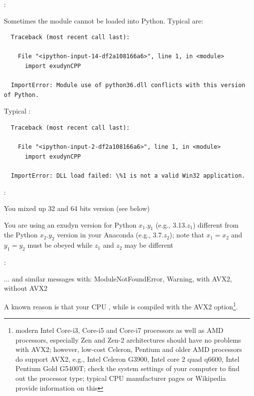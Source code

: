 \noindent {}:
\bi
  \item Sometimes the \codeName module cannot be loaded into Python. Typical  are: \vspace{1pt}\\
\plainlststyle
\begin{lstlisting}
  Traceback (most recent call last):

    File "<ipython-input-14-df2a108166a6>", line 1, in <module>
      import exudynCPP

  ImportError: Module use of python36.dll conflicts with this version of Python.
\end{lstlisting}
%
Typical :\vspace{1pt}\\
\begin{lstlisting}
  Traceback (most recent call last):
  
    File "<ipython-input-2-df2a108166a6>", line 1, in <module>
      import exudynCPP

  ImportError: DLL load failed: \%1 is not a valid Win32 application.
\end{lstlisting}
%
:
\bi
\item[$\ra$] You mixed up 32 and 64 bits version (see below) 
\item[$\ra$] You are using an exudyn version for Python $x_1.y_1$ (e.g., 3.13.$z_1$) different from the Python $x_2.y_2$ version in your Anaconda (e.g., 3.7.$z_2$); note that $x_1=x_2$ and $y_1=y_2$ must be obeyed while $z_1$ and $z_2$ may be different
\ei
%
\item {}:
\bi
\item[$\ra$] ... and similar messages with: ModuleNotFoundError, Warning, with AVX2, without AVX2
\item[$\ra$] A known reason is that your CPU , while \codeName is compiled with the AVX2 option\footnote{modern Intel Core-i3, Core-i5 and Core-i7 processors as well as AMD processors, especially Zen and Zen-2 architectures should have no problems with AVX2; however, low-cost Celeron, Pentium and older AMD processors do  support AVX2, e.g.,  Intel Celeron G3900, Intel core 2 quad q6600, Intel Pentium Gold G5400T; check the system settings of your computer to find out the processor type; typical CPU manufacturer pages or Wikipedia provide information on this}.
